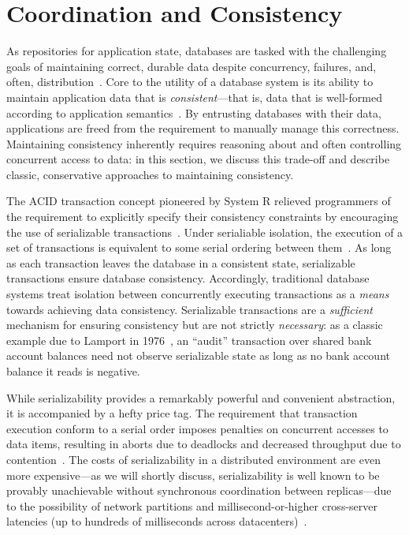 
\section{Coordination and Consistency}
\label{sec:motivation}


As repositories for application state, databases are tasked with the
challenging goals of maintaining correct, durable data despite
concurrency, failures, and, often,
distribution~\cite{bernstein-book}. Core to the utility of a database
system is its ability to maintain application data that is
\textit{consistent}---that is, data that is well-formed according to
application semantics~\cite{gray-virtues}. By entrusting databases
with their data, applications are freed from the requirement to
manually manage this correctness. Maintaining consistency inherently
requires reasoning about and often controlling concurrent access to
data: in this section, we discuss this trade-off and describe classic,
conservative approaches to maintaining consistency.


 The ACID transaction concept
pioneered by System R relieved programmers of the requirement to
explicitly specify their consistency constraints by encouraging the
use of serializable transactions~\cite{gray-virtues}. Under
serialiable isolation, the execution of a set of transactions is
equivalent to some serial ordering between
them~\cite{bernstein-book}. As long as each transaction leaves the
database in a consistent state, serializable transactions ensure
database consistency. Accordingly, traditional database systems treat
isolation between concurrently executing transactions as a
\textit{means} towards achieving data consistency. Serializable
transactions are a \textit{sufficient} mechanism for ensuring
consistency but are not strictly \textit{necessary}: as a classic
example due to Lamport in 1976~\cite{lamport-audit}, an ``audit''
transaction over shared bank account balances need not observe
serializable state as long as no bank account balance it reads is
negative.


While serializability provides a remarkably powerful and convenient
abstraction, it is accompanied by a hefty price tag. The requirement
that transaction execution conform to a serial order imposes penalties
on concurrent accesses to data items, resulting in aborts due to
deadlocks and decreased throughput due to
contention~\cite{bernstein-book,gray-book,gray-virtues}. The costs of
serializability in a distributed environment are even more
expensive---as we will shortly discuss, serializability is well known
to be provably unachievable without synchronous coordination between
replicas---due to the possibility of network partitions and
millisecond-or-higher cross-server latencies (up to hundreds of
milliseconds across datacenters)~\cite{hat-vldb,bobtail}.

